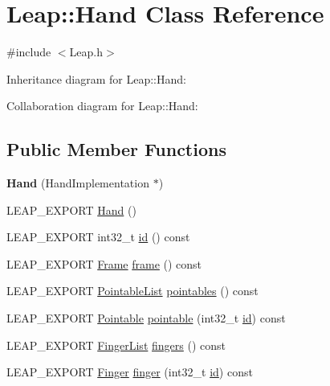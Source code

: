 \hypertarget{class_leap_1_1_hand}{}\section{Leap\+:\+:Hand Class Reference}
\label{class_leap_1_1_hand}


{\ttfamily \#include $<$Leap.\+h$>$}



Inheritance diagram for Leap\+:\+:Hand\+:


Collaboration diagram for Leap\+:\+:Hand\+:
\subsection*{Public Member Functions}
\begin{DoxyCompactItemize}
\item 
\mbox{\label{class_leap_1_1_hand_a52cbd09a5d4f7677d5761d0eafa8c806}} 
{\bfseries Hand} (Hand\+Implementation $\ast$)
\item 
L\+E\+A\+P\+\_\+\+E\+X\+P\+O\+RT \hyperlink{class_leap_1_1_hand_a56f41d7f4cded32073c7bec2cebe926d}{Hand} ()
\item 
L\+E\+A\+P\+\_\+\+E\+X\+P\+O\+RT int32\+\_\+t \hyperlink{class_leap_1_1_hand_a8ef8fb5d06e31b5aa3cc19548d3af205}{id} () const
\item 
L\+E\+A\+P\+\_\+\+E\+X\+P\+O\+RT \hyperlink{class_leap_1_1_frame}{Frame} \hyperlink{class_leap_1_1_hand_abb609377d80becfcaffd5c1ea490f0ea}{frame} () const
\item 
L\+E\+A\+P\+\_\+\+E\+X\+P\+O\+RT \hyperlink{class_leap_1_1_pointable_list}{Pointable\+List} \hyperlink{class_leap_1_1_hand_a845e544e674ab315f10ead9f4a7210fe}{pointables} () const
\item 
L\+E\+A\+P\+\_\+\+E\+X\+P\+O\+RT \hyperlink{class_leap_1_1_pointable}{Pointable} \hyperlink{class_leap_1_1_hand_aa9e572f18122453856267a527abf2bcb}{pointable} (int32\+\_\+t \hyperlink{class_leap_1_1_hand_a8ef8fb5d06e31b5aa3cc19548d3af205}{id}) const
\item 
L\+E\+A\+P\+\_\+\+E\+X\+P\+O\+RT \hyperlink{class_leap_1_1_finger_list}{Finger\+List} \hyperlink{class_leap_1_1_hand_a48bed0aebb87180056eab2bbfbc1e5fe}{fingers} () const
\item 
L\+E\+A\+P\+\_\+\+E\+X\+P\+O\+RT \hyperlink{class_leap_1_1_finger}{Finger} \hyperlink{class_leap_1_1_hand_afe7cf68c3375a2e45f90d80698313ccb}{finger} (int32\+\_\+t \hyperlink{class_leap_1_1_hand_a8ef8fb5d06e31b5aa3cc19548d3af205}{id}) const

\end{DoxyCompactItemize}
